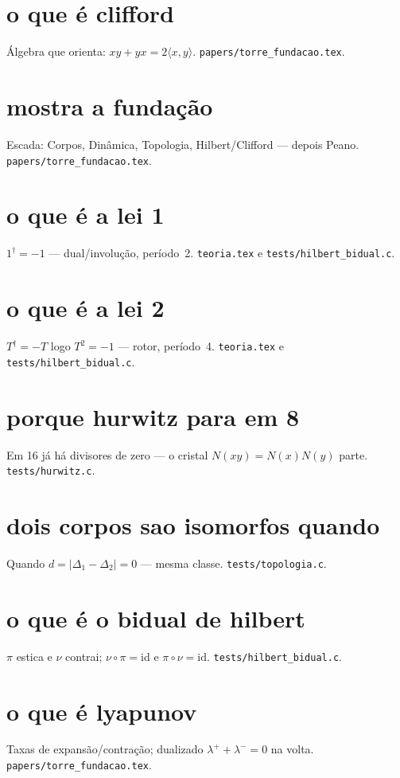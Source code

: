 \documentclass[11pt,a4paper]{article}
\newcommand{\code}[1]{\texttt{\small #1}}
\begin{document}
\section{o que é clifford}
Álgebra que orienta: $xy+yx=2\langle x,y\rangle$.
\code{papers/torre\_fundacao.tex}.

\section{mostra a fundação}
Escada: Corpos, Dinâmica, Topologia, Hilbert/Clifford --- depois Peano.
\code{papers/torre\_fundacao.tex}.

\section{o que é a lei 1}
$1^{\dagger}=-1$ --- dual/involução, período~2.
\code{teoria.tex} e \code{tests/hilbert\_bidual.c}.

\section{o que é a lei 2}
$T^{\dagger}=-T$ logo $T^{2}=-1$ --- rotor, período~4.
\code{teoria.tex} e \code{tests/hilbert\_bidual.c}.

\section{porque hurwitz para em 8}
Em 16 já há divisores de zero --- o cristal $N(xy)=N(x)N(y)$ parte.
\code{tests/hurwitz.c}.

\section{dois corpos sao isomorfos quando}
Quando $d=\lvert\Delta_1-\Delta_2\rvert=0$ --- mesma classe.
\code{tests/topologia.c}.

\section{o que é o bidual de hilbert}
$\pi$ estica e $\nu$ contrai; $\nu\circ\pi=\mathrm{id}$ e $\pi\circ\nu=\mathrm{id}$.
\code{tests/hilbert\_bidual.c}.

\section{o que é lyapunov}
Taxas de expansão/contração; dualizado $\lambda^{+}+\lambda^{-}=0$ na volta.
\code{papers/torre\_fundacao.tex}.
\end{document}
